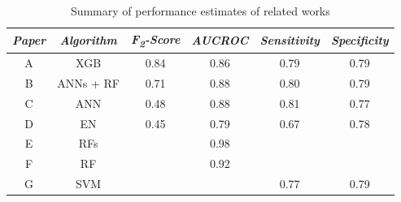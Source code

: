 \begin{table}[h]
\caption{Summary of performance estimates of related works}
\begin{center}
\begin{tabular}{c|c|c|c|c|c}
\textit{Paper} & \textit{Algorithm} & \textit{F\textsubscript{2}-Score} & \textit{AUCROC} & \textit{Sensitivity} & \textit{Specificity} \\
\hline
\hline
A              & XGB                & 0.84              & 0.86            & 0.79                 & 0.79                 \\
B              & ANNs + RF          & 0.71              & 0.88            & 0.80                 & 0.79                 \\
C              & ANN                & 0.48              & 0.88            & 0.81                 & 0.77                 \\
D              & EN                 & 0.45              & 0.79            & 0.67                 & 0.78                 \\
E              & RFs                &                   & 0.98            &                      &                      \\
F              & RF                 &                   & 0.92            &                      &                      \\
G              & SVM                &                   &                 & 0.77                 & 0.79                 \\
\hline
\end{tabular}
\end{center}
\label{tab:related-work-comparison}
\end{table}